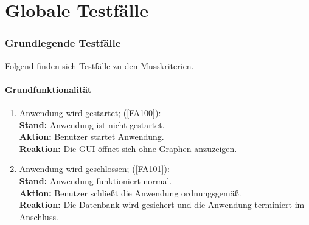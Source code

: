 \documentclass[13pt]{scrreprt}
\begin{document}
\chapter{Globale Testfälle}

\subsection{Grundlegende Testfälle}
\begin{flushleft}
Folgend finden sich Testfälle zu den Musskriterien.
\end{flushleft}

\subsubsection{Grundfunktionalität}
\begin{addmargin}[25pt]{0pt}
	\begin{enumerate} [label=T\arabic*,start=100]
		\item Anwendung wird gestartet; (\ref{FA100}):
		\\
		\textbf{Stand:} Anwendung ist nicht gestartet.
		\\
		\textbf{Aktion:} Benutzer startet Anwendung.
		\\
		\textbf{Reaktion:} Die GUI öffnet sich ohne Graphen anzuzeigen.
		
		\item Anwendung wird geschlossen; (\ref{FA101}):
		\\
		\textbf{Stand:} Anwendung funktioniert normal.
		\\
		\textbf{Aktion:} Benutzer schließt die Anwendung ordnungsgemäß.
		\\
		\textbf{Reaktion:} Die Datenbank wird gesichert und die Anwendung terminiert im Anschluss.
	\end{enumerate}
\end{addmargin}
\end{document}
